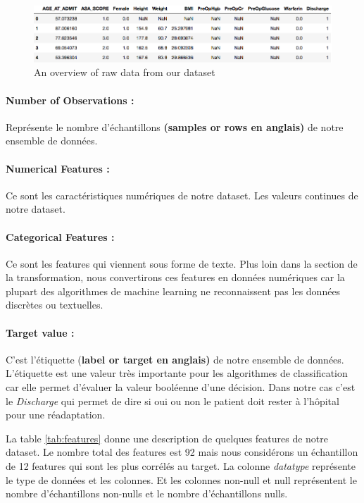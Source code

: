 \documentclass[12pt, french]{article}
\begin{document}
\begin{figure}[h]
\includegraphics{images/examplesfeatures.png}
\caption{An overview of raw data from our dataset}
\label{fig:samplesdataset}
\end{figure}


\paragraph{Number of Observations :} Représente le nombre d'échantillons \textbf{(samples or rows en anglais)} de notre ensemble de données. 

\paragraph{ Numerical Features :} Ce sont les caractéristiques numériques de notre dataset. Les valeurs continues de notre dataset.

\paragraph{ Categorical Features :} Ce sont les features qui viennent sous forme de texte. Plus loin dans la section de la transformation, nous convertirons ces features en données numériques car la plupart des algorithmes de machine learning ne reconnaissent pas les données discrètes ou textuelles.

\paragraph{ Target value :} C'est l'étiquette (\textbf{label or target en anglais)} de notre ensemble de données. L'étiquette est une valeur très importante pour les algorithmes de classification car elle permet d'évaluer la valeur booléenne d'une décision. Dans notre cas c'est le \textit{Discharge} qui permet de dire si oui ou non le patient doit rester à l'hôpital pour une réadaptation. 

La table \ref{tab:features} donne une description de quelques features de notre dataset. Le nombre total des features est 92 mais nous considérons un échantillon de 12 features qui sont les plus corrélés au target. La colonne \textit{datatype} représente le type de données et les colonnes. Et les colonnes non-null et null représentent le nombre d'échantillons non-nulls et le nombre d'échantillons nulls.
\end{document}
